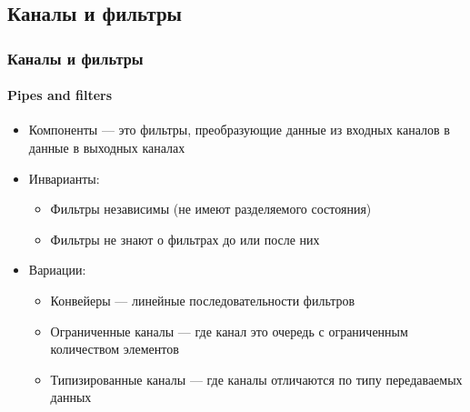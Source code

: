 \documentclass[xetex,mathserif,serif]{beamer}
\begin{document}
    \subsection{Каналы и фильтры}

    \begin{frame}
        \frametitle{Каналы и фильтры}
        \framesubtitle{Pipes and filters}
        \begin{itemize}
            \item Компоненты --- это фильтры, преобразующие данные из входных каналов в данные в выходных каналах
            \item Инварианты:
            \begin{itemize}
                \item Фильтры независимы (не имеют разделяемого состояния)
                \item Фильтры не знают о фильтрах до или после них
            \end{itemize}
            \item Вариации:
            \begin{itemize}
                \item Конвейеры --- линейные последовательности фильтров
                \item Ограниченные каналы --- где канал это очередь с ограниченным количеством элементов
                \item Типизированные каналы --- где каналы отличаются по типу передаваемых данных
            \end{itemize}
        \end{itemize}
    \end{frame}
\end{document}

